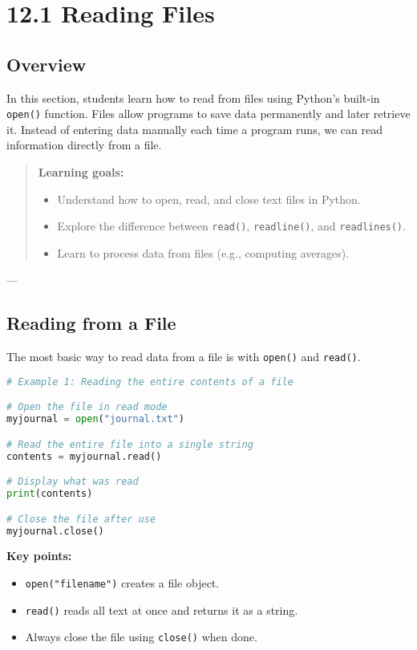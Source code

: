 \chapter{12.1 Reading Files}

\section*{Overview}
In this section, students learn how to read from files using Python's built-in \texttt{open()} function. 
Files allow programs to save data permanently and later retrieve it. 
Instead of entering data manually each time a program runs, we can read information directly from a file.

\begin{quote}
\textbf{Learning goals:}
\begin{itemize}
  \item Understand how to open, read, and close text files in Python.
  \item Explore the difference between \texttt{read()}, \texttt{readline()}, and \texttt{readlines()}.
  \item Learn to process data from files (e.g., computing averages).
\end{itemize}
\end{quote}

---

\section{Reading from a File}

The most basic way to read data from a file is with \texttt{open()} and \texttt{read()}.

\begin{lstlisting}[language=Python, caption={Reading text from a file.}]
# Example 1: Reading the entire contents of a file

# Open the file in read mode
myjournal = open("journal.txt")

# Read the entire file into a single string
contents = myjournal.read()

# Display what was read
print(contents)

# Close the file after use
myjournal.close()
\end{lstlisting}

\noindent
\textbf{Key points:}
\begin{itemize}
  \item \texttt{open("filename")} creates a file object.
  \item \texttt{read()} reads all text at once and returns it as a string.
  \item Always close the file using \texttt{close()} when done.
\end{itemize}


